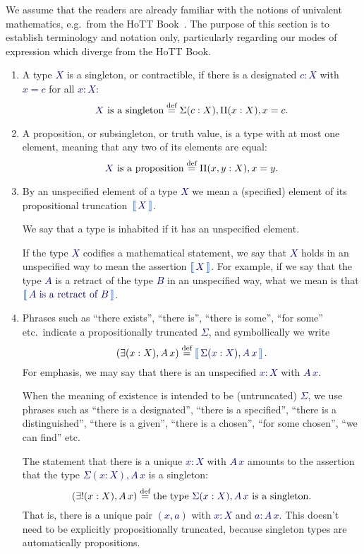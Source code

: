 \documentclass[10pt]{article}
\makeatletter
\newcommand{\db}{\textcolor{darkblue}}
\newcommand\leftcolor[2]{%
  \edef\@tempa{#1}%
  \ifx\@tempa\@empty
    \edef\@tempa{darkblue}%
  \fi
 \mathinner\bgroup\begingroup\color{\@tempa}\left#2\normalcolor%
}
\newcommand\rightcolor[2]{%
  \edef\@tempa{#1}%
  \ifx\@tempa\@empty
    \edef\@tempa{darkblue}%
  \fi
  \color{\@tempa}\right#2\endgroup\egroup%
}
\newcommand{\trunc}[1]{\leftcolor{darkgreen}\llbracket\,\db{#1}\,\rightcolor{darkgreen}\rrbracket}
\newcommand{\m}[1]{\db{$#1$}}
\newcommand{\eqdef}{\overset{\text{def}}{=}}
\theoremstyle{definition}
\makeatother
\begin{document}
We assume that the readers are already familiar with the notions of
univalent mathematics, e.g.\ from the HoTT Book~\cite{hottbook}. The
purpose of this section is to establish terminology and notation only,
particularly regarding our modes of expression which diverge from the HoTT
Book.
\begin{enumerate}
\item A type \m{X} is a singleton, or contractible, if there is a
  designated \m{c:X} with \m{x = c} for all \m{x:X}:
  \[
    \text{\m{X} is a singleton} \eqdef \Sigma (c : X), \Pi (x:X), x = c.
  \]

\item A proposition, or subsingleton, or truth value, is a type with
  at most one element, meaning that any two of its elements are
  equal:
  \[
  \text{\m{X} is a proposition} \eqdef \Pi(x,y:X), x=y.
  \]

\item
  By an unspecified element of a type \m{X} we mean a (specified)
  element of its propositional truncation~\m{\trunc{X}}.

  We say that a type is inhabited if it has an unspecified element.

  If the type \m{X} codifies a mathematical statement, we say that
  \m{X} holds in an unspecified way to mean the assertion
  \m{\trunc{X}}. For example, if we say that the type \m{A} is a
  retract of the type \m{B} in an unspecified way, what we mean is that
  \m{\trunc{\text{\m{A} is a retract of \m{B}}}}.

\item Phrases such as ``there exists'', ``there is'', ``there is some'', ``for some'' etc.\ indicate a propositionally truncated \m{\Sigma}, and symbollically we write  \[ (\exists (x:X), A \, x) \eqdef  \trunc{\Sigma (x:X), A \, x}.\]
For emphasis, we may say that there is an unspecified \m{x:X} with \m{A\,x}.

  When the meaning of existence is intended to be (untruncated)
  \m{\Sigma}, we use phrases such as ``there is a designated'', ``there
  is a specified'', ``there is a distinguished'', ``there is a given'', ``there is a chosen'', ``for some chosen'', ``we can find'' etc.

  The statement that there is a unique \m{x:X} with \m{A \, x} amounts to
  the assertion that the type \m{\Sigma (x:X), A \, x} is a singleton:
  \[
    (\exists! (x:X), A \, x) \eqdef \text{the type \m{\Sigma (x:X), A \, x} is a singleton}.
  \]
  That is, there is a unique pair \m{(x,a)} with \m{x:X} and \m{a : A\,
  x}. This doesn't need to be explicitly propositionally truncated,
  because singleton types are automatically propositions.


\end{enumerate}
\end{document}
